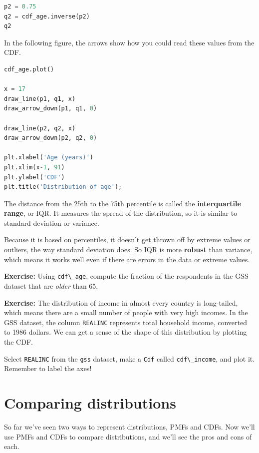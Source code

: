 \begin{lstlisting}[language=Python,style=source]
p2 = 0.75
q2 = cdf_age.inverse(p2)
q2
\end{lstlisting}

In the following figure, the arrows show how you could read these values
from the CDF.

\begin{lstlisting}[language=Python,style=source]
cdf_age.plot()

x = 17
draw_line(p1, q1, x)
draw_arrow_down(p1, q1, 0)

draw_line(p2, q2, x)
draw_arrow_down(p2, q2, 0)

plt.xlabel('Age (years)')
plt.xlim(x-1, 91)
plt.ylabel('CDF')
plt.title('Distribution of age');
\end{lstlisting}

The distance from the 25th to the 75th percentile is called the
\textbf{interquartile range}, or IQR. It measures the spread of the
distribution, so it is similar to standard deviation or variance.

Because it is based on percentiles, it doesn't get thrown off by extreme
values or outliers, the way standard deviation does. So IQR is more
\textbf{robust} than variance, which means it works well even if there
are errors in the data or extreme values.

\textbf{Exercise:} Using \passthrough{\lstinline!cdf\_age!}, compute the
fraction of the respondents in the GSS dataset that are \emph{older}
than 65.

\textbf{Exercise:} The distribution of income in almost every country is
long-tailed, which means there are a small number of people with very
high incomes. In the GSS dataset, the column
\passthrough{\lstinline!REALINC!} represents total household income,
converted to 1986 dollars. We can get a sense of the shape of this
distribution by plotting the CDF.

Select \passthrough{\lstinline!REALINC!} from the
\passthrough{\lstinline!gss!} dataset, make a
\passthrough{\lstinline!Cdf!} called
\passthrough{\lstinline!cdf\_income!}, and plot it. Remember to label
the axes!

\hypertarget{comparing-distributions}{%
\section{Comparing distributions}\label{comparing-distributions}}

So far we've seen two ways to represent distributions, PMFs and CDFs.
Now we'll use PMFs and CDFs to compare distributions, and we'll see the
pros and cons of each.

